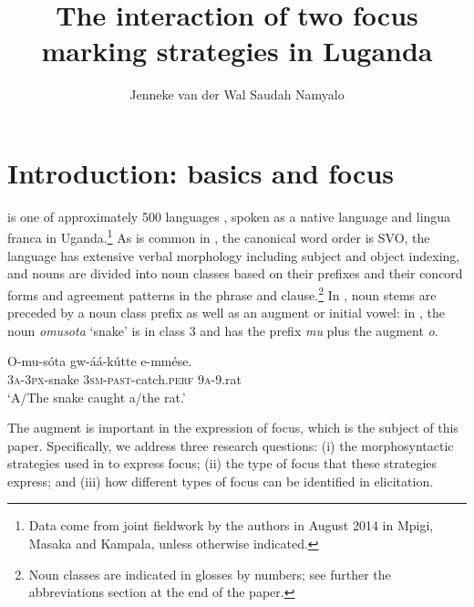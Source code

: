 \documentclass[output=paper]{langsci/langscibook}
\title{The interaction of two focus marking strategies in Luganda}
\author{%
Jenneke van der Wal \affiliation{University of Cambridge}\lastand 
 Saudah Namyalo \affiliation{Makerere University}
}
\begin{document}
 
 
%



\section{Introduction:  basics and focus}\label{sec:vanderwal:1}

 is one of approximately 500  languages \citep[4]{NursePhilippson2003}, spoken as a native language and lingua franca in Uganda.\footnote{Data come from joint fieldwork by the authors in August 2014 in Mpigi, Masaka and Kampala, unless otherwise indicated.}{} As is common in , the canonical word order is SVO, the language has extensive verbal morphology including subject and object indexing, and nouns are divided into noun classes based on their prefixes and their concord forms and agreement patterns in the phrase and clause.\footnote{Noun classes are indicated in glosses by numbers; see further the abbreviations section at the end of the paper.}{} In , noun stems are preceded by a noun class prefix as well as an augment or initial vowel: in , the noun \textit{omusota} ‘snake’ is in class 3 and has the prefix \textit{mu} plus the augment \textit{o}. 

\ea\label{ex:vanderwal:1}
\gll O-mu-sóta  gw-áá-kútte      e-mmése.\\
     \textsc{3a}-\textsc{3px}-snake  \textsc{3sm}-\textsc{past}-catch.\textsc{perf}  \textsc{9a}-9.rat\\
\glt ‘A/The snake caught a/the rat.’
\z

The augment is important in the expression of focus, which is the subject of this paper. Specifically, we address three research questions: 
(i) the morphosyntactic strategies used in  to express focus; 
(ii) the type of focus that these strategies express; 
and (iii) how different types of focus can be identified in elicitation.
\end{document}

